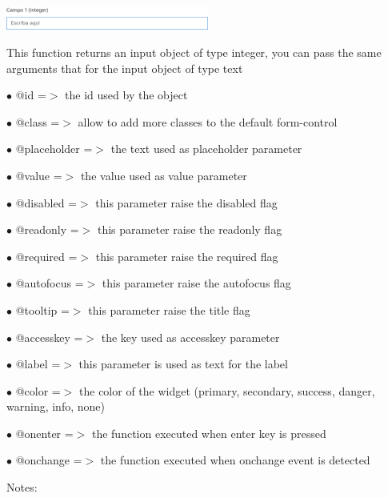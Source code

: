 \documentclass[a4paper]{article}
\begin{document}
\begin{center}\includegraphics[width=0.5\textwidth]{../ujest/snaps/test-bootstrap-js-bootstrap-campo-1-integer-1-snap.png}\end{center}

This function returns an input object of type integer, you can pass the same arguments
that for the input object of type text

\begin{compactitem}
\item[\color{myblue}$\bullet$] @id          =$>$ the id used by the object
\item[\color{myblue}$\bullet$] @class       =$>$ allow to add more classes to the default form-control
\item[\color{myblue}$\bullet$] @placeholder =$>$ the text used as placeholder parameter
\item[\color{myblue}$\bullet$] @value       =$>$ the value used as value parameter
\item[\color{myblue}$\bullet$] @disabled    =$>$ this parameter raise the disabled flag
\item[\color{myblue}$\bullet$] @readonly    =$>$ this parameter raise the readonly flag
\item[\color{myblue}$\bullet$] @required    =$>$ this parameter raise the required flag
\item[\color{myblue}$\bullet$] @autofocus   =$>$ this parameter raise the autofocus flag
\item[\color{myblue}$\bullet$] @tooltip     =$>$ this parameter raise the title flag
\item[\color{myblue}$\bullet$] @accesskey   =$>$ the key used as accesskey parameter
\item[\color{myblue}$\bullet$] @label       =$>$ this parameter is used as text for the label
\item[\color{myblue}$\bullet$] @color       =$>$ the color of the widget (primary, secondary, success, danger, warning, info, none)
\item[\color{myblue}$\bullet$] @onenter     =$>$ the function executed when enter key is pressed
\item[\color{myblue}$\bullet$] @onchange    =$>$ the function executed when onchange event is detected
\end{compactitem}

Notes:
\end{document}
